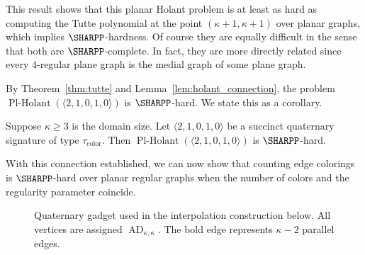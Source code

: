 \documentclass[11pt]{article}
\newcommand{\PlHolant}{\operatorname{Pl-Holant}}
\newcommand{\AD}{\operatorname{AD}}
\newenvironment{remark}{\medskip{\bfseries \noindent Remark:}}{\par\medskip}{\par\medskip}
\def\borderColor{blue!60}
\def\scale{0.6}
\def\nodeDist{1.4cm}
\begin{document}
\begin{remark}
 This result shows that this planar Holant problem is at least as hard as computing the Tutte polynomial at the point $(\kappa+1, \kappa+1)$ over planar graphs,
 which implies $\SHARPP$-hardness.
 Of course they are equally difficult in the sense that both are $\SHARPP$-complete.
 In fact,
 they are more directly related since every $4$-regular plane graph is the medial graph of some plane graph.
\end{remark}

By Theorem~\ref{thm:tutte} and Lemma~\ref{lem:holant_connection},
the problem $\PlHolant(\langle 2,1,0,1,0 \rangle)$ is $\SHARPP$-hard.
We state this as a corollary.

\begin{corollary} \label{cor:k=r:21010_hard}
 Suppose $\kappa \ge 3$ is the domain size.
 Let $\langle 2,1,0,1,0 \rangle$ be a succinct quaternary signature of type $\tau_\text{color}$.
 Then $\PlHolant(\langle 2,1,0,1,0 \rangle)$ is $\SHARPP$-hard.
\end{corollary}

With this connection established,
we can now show that counting edge colorings is $\SHARPP$-hard over planar regular graphs when the number of colors and the regularity parameter coincide.

\begin{figure}[t]
 \centering
 \caption{Quaternary gadget used in the interpolation construction below.
 All vertices are assigned $\AD_{\kappa,\kappa}$.
 The bold edge represents $\kappa - 2$ parallel edges.}
 \label{fig:gadget:k=r:arity_reduction}
\end{figure}
\end{document}
